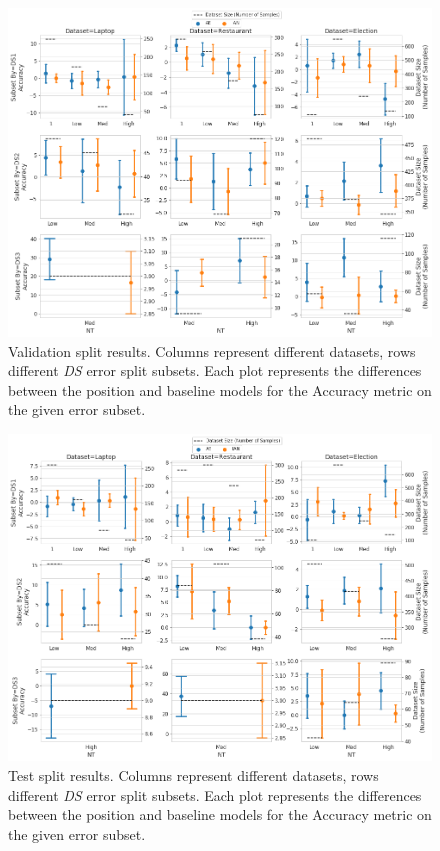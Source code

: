 \begin{figure}[h!]
    \centering
    \includegraphics[scale=0.4]{images/augmentation/methods_performance/Position_Encoding/position_DS_NT_validation.png}
    \caption{Validation split results. Columns represent different datasets, rows different \textit{DS} error split subsets. Each plot represents the differences between the position and baseline models for the Accuracy metric on the given error subset.}
    \label{fig:aug_position_DS_NT_validation}
\end{figure}

\begin{figure}[h!]
    \centering
    \includegraphics[scale=0.4]{images/augmentation/methods_performance/Position_Encoding/position_DS_NT_test.png}
    \caption{Test split results. Columns represent different datasets, rows different \textit{DS} error split subsets. Each plot represents the differences between the position and baseline models for the Accuracy metric on the given error subset.}
    \label{fig:aug_position_DS_NT_test}
\end{figure}

